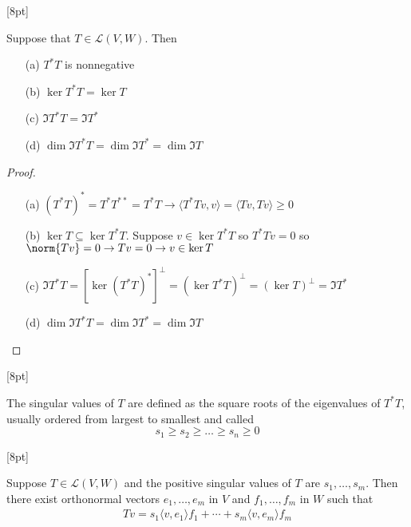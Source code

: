\documentclass{article}
\begin{document}
[8pt]
\begin{theorem}[frametitle={}]
	Suppose that $T \in \mathcal{L}(V,W)$. Then 
	\begin{enumerate}
		\item [(a)] $T^{*}T$ is nonnegative

		\item [(b)] $\ker{T^{*}T} = \ker{T}$

		\item [(c)] $\Im{T^{*}T} = \Im{T^{*}}$ 

		\item [(d)] $\dim{\Im{T^{*}T}} = \dim{\Im{T^{*}}} = \dim{\Im{T}}$ 
	\end{enumerate}
\end{theorem}
\begin{proof}
	\begin{enumerate}
		\item [(a)] $(T^{*}T)^{*} = T^{*}T^{**} = T^{*}T \rightarrow \langle T^{*}Tv, v \rangle = \langle Tv, Tv \rangle \geq 0$	

		\item [(b)] $\ker{T} \subseteq \ker{T^{*}T}$. Suppose $v \in \ker{T^{*}T}$ so $T^{*}Tv = 0$ so $\norm{Tv}= 0 \rightarrow Tv = 0 \rightarrow v \in \ker{T}$

		\item [(c)] $\Im{T^{*}T} = [\ker{(T^{*}T)^{*}}]^{\perp} = (\ker{T^{*}T})^{\perp} = (\ker{T})^{\perp} = \Im{T^{*}}$

		\item [(d)] $\dim{\Im{T^{*}T}} = \dim{\Im{T^{*}}} = \dim{\Im{T}}$
	\end{enumerate}
\end{proof}
[8pt]
\begin{definition}[frametitle={Singular Value Decomposition}]
	The singular values of $T$ are defined as the square roots of the eigenvalues of $T^{*}T$, usually ordered from largest to smallest and called 
	\begin{equation*}
		s_{1} \geq s_{2} \geq \ldots \geq s_{n} \geq 0	
	\end{equation*}
\end{definition}
[8pt]
\begin{theorem}[frametitle={}]
	Suppose $T \in \mathcal{L}(V, W)$ and the positive singular values of $T$ are $s_{1}, \ldots, s_{m}$. Then there exist orthonormal vectors $e_{1}, \ldots, e_{m}$ in $V$ and $f_{1}, \ldots, f_{m}$ in $W$ such that 
	\begin{align*}
		Tv = s_{1}\langle v,e_{1} \rangle f_{1} + \cdots + s_{m}\langle v,e_{m} \rangle f_{m}
	\end{align*}
	
\end{theorem}
\end{document}
